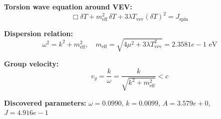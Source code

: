 
\textbf{Torsion wave equation around VEV:}
\begin{equation}
  \Box \delta T + m_{\text{eff}}^2 \, \delta T + 3\lambda T_{\text{vev}} (\delta T)^2 = J_{\text{spin}}
\end{equation}

\textbf{Dispersion relation:}
\begin{equation}
  \omega^2 = k^2 + m_{\text{eff}}^2, \quad
  m_{\text{eff}} = \sqrt{4\mu^2 + 3\lambda T_{\text{vev}}^2} = 2.3581e-1 \text{ eV}
\end{equation}

\textbf{Group velocity:}
\begin{equation}
  v_g = \frac{k}{\omega} = \frac{k}{\sqrt{k^2 + m_{\text{eff}}^2}} < c
\end{equation}

\textbf{Discovered parameters:}
$\omega = 0.0990$, \quad
$k = 0.0099$, \quad
$A = 3.579e+0$, \quad
$J = 4.916e-1$